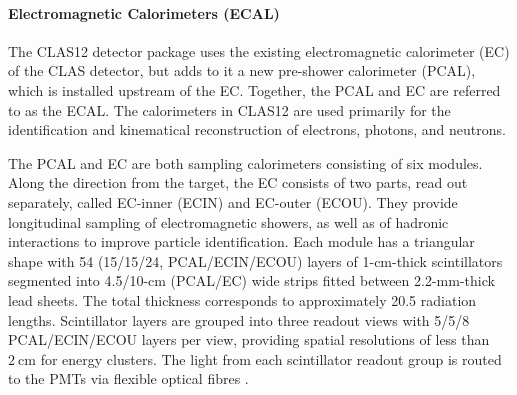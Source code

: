 \paragraph{Electromagnetic Calorimeters (ECAL)}
    The CLAS12 detector package uses the existing electromagnetic calorimeter (EC) of the CLAS detector, but adds to it a new pre-shower calorimeter (PCAL), which is installed upstream of the EC.
    Together, the PCAL and EC are referred to as the ECAL.
    The calorimeters in CLAS12 are used primarily for the identification and kinematical reconstruction of electrons, photons, and neutrons.

    The PCAL and EC are both sampling calorimeters consisting of six modules.
    Along the direction from the target, the EC consists of two parts, read out separately, called EC-inner (ECIN) and EC-outer (ECOU).
    They provide longitudinal sampling of electromagnetic showers, as well as of hadronic interactions to improve particle identification.
    Each module has a triangular shape with 54 (15/15/24, PCAL/ECIN/ECOU) layers of 1-cm-thick scintillators segmented into 4.5/10-cm (PCAL/EC) wide strips fitted between 2.2-mm-thick lead sheets.
    The total thickness corresponds to approximately 20.5 radiation lengths.
    Scintillator layers are grouped into three readout views with 5/5/8 PCAL/ECIN/ECOU layers per view, providing spatial resolutions of less than $2 ~\text{cm}$ for energy clusters.
    The light from each scintillator readout group is routed to the PMTs via flexible optical fibres \cite{asryan2020}.

